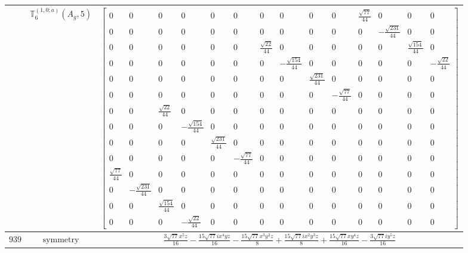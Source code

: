 \documentclass[fleqn,8pt,landscape]{jsarticle}
\begin{document}
\begin{longtable}{ccc}
$  $ & $ \mathbb{T}_{6}^{(1,0;a)}(A_{g},5) $ & $ \begin{bmatrix} 0 & 0 & 0 & 0 & 0 & 0 & 0 & 0 & 0 & 0 & \frac{\sqrt{77}}{44} & 0 & 0 & 0 \\ 0 & 0 & 0 & 0 & 0 & 0 & 0 & 0 & 0 & 0 & 0 & - \frac{\sqrt{231}}{44} & 0 & 0 \\ 0 & 0 & 0 & 0 & 0 & 0 & \frac{\sqrt{22}}{44} & 0 & 0 & 0 & 0 & 0 & \frac{\sqrt{154}}{44} & 0 \\ 0 & 0 & 0 & 0 & 0 & 0 & 0 & - \frac{\sqrt{154}}{44} & 0 & 0 & 0 & 0 & 0 & - \frac{\sqrt{22}}{44} \\ 0 & 0 & 0 & 0 & 0 & 0 & 0 & 0 & \frac{\sqrt{231}}{44} & 0 & 0 & 0 & 0 & 0 \\ 0 & 0 & 0 & 0 & 0 & 0 & 0 & 0 & 0 & - \frac{\sqrt{77}}{44} & 0 & 0 & 0 & 0 \\ 0 & 0 & \frac{\sqrt{22}}{44} & 0 & 0 & 0 & 0 & 0 & 0 & 0 & 0 & 0 & 0 & 0 \\ 0 & 0 & 0 & - \frac{\sqrt{154}}{44} & 0 & 0 & 0 & 0 & 0 & 0 & 0 & 0 & 0 & 0 \\ 0 & 0 & 0 & 0 & \frac{\sqrt{231}}{44} & 0 & 0 & 0 & 0 & 0 & 0 & 0 & 0 & 0 \\ 0 & 0 & 0 & 0 & 0 & - \frac{\sqrt{77}}{44} & 0 & 0 & 0 & 0 & 0 & 0 & 0 & 0 \\ \frac{\sqrt{77}}{44} & 0 & 0 & 0 & 0 & 0 & 0 & 0 & 0 & 0 & 0 & 0 & 0 & 0 \\ 0 & - \frac{\sqrt{231}}{44} & 0 & 0 & 0 & 0 & 0 & 0 & 0 & 0 & 0 & 0 & 0 & 0 \\ 0 & 0 & \frac{\sqrt{154}}{44} & 0 & 0 & 0 & 0 & 0 & 0 & 0 & 0 & 0 & 0 & 0 \\ 0 & 0 & 0 & - \frac{\sqrt{22}}{44} & 0 & 0 & 0 & 0 & 0 & 0 & 0 & 0 & 0 & 0 \end{bmatrix} $ \\ \hline
$ 939 $ & $ \text{symmetry} $ & $ \frac{3 \sqrt{77} x^{5} z}{16} - \frac{15 \sqrt{77} i x^{4} y z}{16} - \frac{15 \sqrt{77} x^{3} y^{2} z}{8} + \frac{15 \sqrt{77} i x^{2} y^{3} z}{8} + \frac{15 \sqrt{77} x y^{4} z}{16} - \frac{3 \sqrt{77} i y^{5} z}{16} $ \\

\end{longtable}
\end{document}
